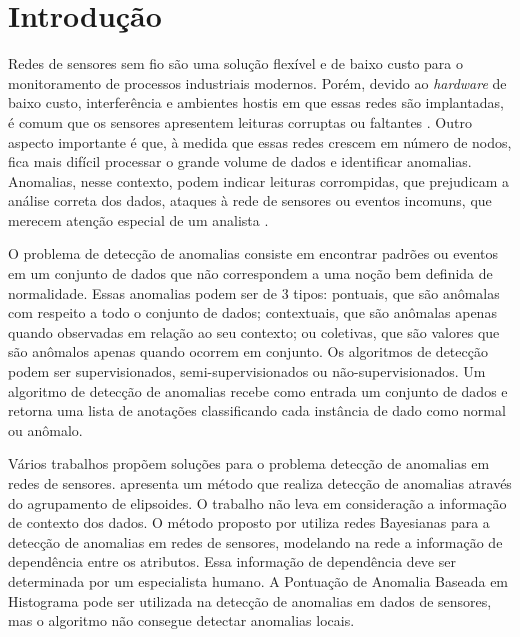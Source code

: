 \documentclass[cic,tc]{iiufrgs}
\begin{document}
\chapter{Introdução}

Redes de sensores sem fio são uma solução flexível e de baixo custo para o monitoramento de processos industriais modernos. Porém, devido ao \textit{hardware} de baixo custo, interferência e ambientes hostis em que essas redes são implantadas, é comum que os sensores apresentem leituras corruptas ou faltantes \cite{wireless2002}. Outro aspecto importante é que, à medida que essas redes crescem em número de nodos, fica mais difícil processar o grande volume de dados e identificar anomalias. Anomalias, nesse contexto, podem indicar leituras corrompidas, que prejudicam a análise correta dos dados, ataques à rede de sensores ou eventos incomuns, que merecem atenção especial de um analista \cite{AnomalyDetectionSurvey2009}.

O problema de detecção de anomalias consiste em encontrar padrões ou eventos em um conjunto de dados que não correspondem a uma noção bem definida de normalidade. Essas anomalias podem ser de 3 tipos: pontuais, que são anômalas com respeito a todo o conjunto de dados; contextuais, que são anômalas apenas quando observadas em relação ao seu contexto; ou coletivas, que são valores que são anômalos apenas quando ocorrem em conjunto. Os algoritmos de detecção podem ser supervisionados, semi-supervisionados ou não-supervisionados. Um algoritmo de detecção de anomalias recebe como entrada um conjunto de dados e retorna uma lista de anotações classificando cada instância de dado como normal ou anômalo.

Vários trabalhos propõem soluções para o problema detecção de anomalias em redes de sensores. \cite{Ellipsoids2009} apresenta um método que realiza detecção de anomalias através do agrupamento de elipsoides. O trabalho não leva em consideração a informação de contexto dos dados. O método proposto por \cite{BayesianBelief} utiliza redes Bayesianas para a detecção de anomalias em redes de sensores, modelando na rede a informação de dependência entre os atributos. Essa informação de dependência deve ser determinada por um especialista humano. A Pontuação de Anomalia Baseada em Histograma \cite{hbos2012} pode ser utilizada na detecção de anomalias em dados de sensores, mas o algoritmo não consegue detectar anomalias locais.
\end{document}

